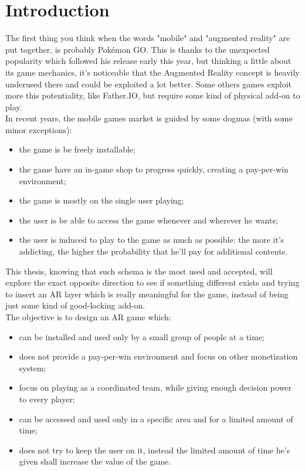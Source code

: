 \chapter{Introduction}
	
	The first thing you think when the words "mobile" and "augmented reality" are put together, is probably Pokémon GO. This is thanks to the unexpected popularity which followed his release early this year, but thinking a little about its game mechanics, it's noticeable that the Augmented Reality concept is heavily underused there and could be exploited a lot better.
	Some others games exploit more this potentiality, like Father.IO, but require some kind of physical add-on to play. \\
	
	In recent years, the mobile games market is guided by some dogmas (with some minor exceptions):
	\begin{itemize}
		\item the game is be freely installable;
		\item the game have an in-game shop to progress quickly, creating a pay-per-win environment;
		\item the game is mostly on the single user playing;
		\item the user is be able to access the game whenever and wherever he wants;
		\item the user is induced to play to the game as much as possible: the more it's addicting, the higher the probability that he'll pay for additional contents.
	\end{itemize}
	
	This thesis, knowing that such schema is the most used and accepted, will explore the exact opposite direction to see if something different exists and trying to insert an AR layer which is really meaningful for the game, instead of being just some kind of good-locking add-on. \\
	
	The objective is to design an AR game which: 
	\begin{itemize}
		\item can be installed and used only by a small group of people at a time;
		\item does not provide a pay-per-win environment and focus on other monetization system;
		\item focus on playing as a coordinated team, while giving enough decision power to every player;
		\item can be accessed and used only in a specific area and for a limited amount of time;
		\item does not try to keep the user on it, instead the limited amount of time he's given shall increase the value of the game.
	\end{itemize}
	
